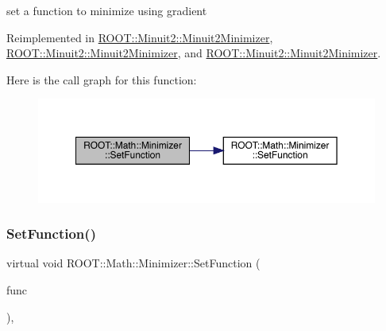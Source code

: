 set a function to minimize using gradient 



Reimplemented in \mbox{\hyperlink{classROOT_1_1Minuit2_1_1Minuit2Minimizer_aeb98c40cf3486fe8fb9bec4da0f7942e}{R\+O\+O\+T\+::\+Minuit2\+::\+Minuit2\+Minimizer}}, \mbox{\hyperlink{classROOT_1_1Minuit2_1_1Minuit2Minimizer_aeb98c40cf3486fe8fb9bec4da0f7942e}{R\+O\+O\+T\+::\+Minuit2\+::\+Minuit2\+Minimizer}}, and \mbox{\hyperlink{classROOT_1_1Minuit2_1_1Minuit2Minimizer_aeb98c40cf3486fe8fb9bec4da0f7942e}{R\+O\+O\+T\+::\+Minuit2\+::\+Minuit2\+Minimizer}}.

Here is the call graph for this function\+:
\nopagebreak
\begin{figure}[H]
\begin{center}
\leavevmode
\includegraphics[width=350pt]{dc/dc4/classROOT_1_1Math_1_1Minimizer_a1d9ff15aa732e518a60a05dcbd82c34a_cgraph}
\end{center}
\end{figure}
\mbox{\label{classROOT_1_1Math_1_1Minimizer_a1d9ff15aa732e518a60a05dcbd82c34a}} 
\subsubsection{\texorpdfstring{SetFunction()}{SetFunction()}\hspace{0.1cm}{\footnotesize\ttfamily [5/6]}}
{\footnotesize\ttfamily virtual void R\+O\+O\+T\+::\+Math\+::\+Minimizer\+::\+Set\+Function (\begin{DoxyParamCaption}\item[{const \mbox{\hyperlink{namespaceROOT_1_1Math_a014e019aaf9304a00e9231bd9ed232fb}{R\+O\+O\+T\+::\+Math\+::\+I\+Multi\+Grad\+Function}} \&}]{func }\end{DoxyParamCaption})\hspace{0.3cm}{\ttfamily [inline]}, {\ttfamily [virtual]}}



